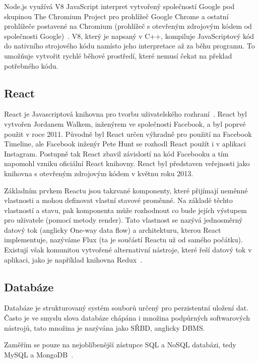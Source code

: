 Node.js využívá V8 JavaScript interpret vytvořený společností Google pod skupinou The Chromium Project pro prohlížeč Google Chrome a ostatní prohlížeče postavené na Chromium (prohlížeč s otevřeným zdrojovým kódem od společnosti Google)~\cite{node:es6}.
V8, který je napsaný v C++, kompiluje JavaScriptový kód do nativního strojového kódu namísto jeho interpretace až za běhu programu.
To umožňuje vytvořit rychlé běhové prostředí, které nemusí čekat na překlad potřebného kódu.~\cite{node:article2013}

\subsection{React}\label{subsec:reactjs}

React je Javascriptová knihovna pro tvorbu uživatelského rozhraní~\cite{react:about}.
React byl vytvořen Jordanem Walkem, inženýrem ve společnosti Facebook, a byl poprvé použit v roce 2011.
Původně byl React určen výhradně pro použití na Facebook Timeline, ale Facebook inženýr Pete Hunt se rozhodl React použít i v aplikaci Instagram.
Postupně tak React zbavil závislostí na kód Facebooku a tím napomohl vzniku oficiální React knihovny.
React byl představen veřejnosti jako knihovna s otevřeným zdrojovým kódem v květnu roku 2013.~\cite{react:author}

Základním prvkem Reactu jsou takzvané komponenty, které přijímají neměnné vlastnosti a mohou definovat vlastní stavové proměnné.
Na základě těchto vlastností a stavu, pak komponenta může rozhodnout co bude jejích výstupem pro uživatele (pomocí metody render).
Tato vlastnost se nazývá jednosměrný datový tok (anglicky One-way data flow) a architekturu, kterou React implementuje, nazýváme Flux (ta je součástí Reactu už od samého počátku).~\cite{react:about}
Existují však komunitou vytvořené alternativní nástroje, které řeší datový tok v aplikaci, jako je například knihovna Redux~\cite{react:redux}.

\subsection{Databáze}\label{subsec:databáze}
Databáze je strukturovaný systém souborů určený pro perzistentní uložení dat.
Často je ve smyslu slova databáze chápána i množina podpůrných softwarových nástrojů, tato množina je nazývána jako \gls{SŘBD}, anglicky \gls{DBMS}.

Zaměřím se pouze na nejoblíbenější zástupce \gls{SQL} a \gls{NoSQL} databázi, tedy MySQL a MongoDB~\cite{mongo:popularity}.

